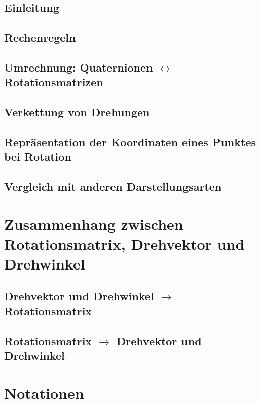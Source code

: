 \documentclass[a4paper, 11pt, accentcolor = tud3b]{tudreport}
\begin{document}
		\section{Einleitung} %

		\section{Rechenregeln} %

		\section{Umrechnung: Quaternionen \(\leftrightarrow\) Rotationsmatrizen} %

		\section{Verkettung von Drehungen} %

		\section{Repräsentation der Koordinaten eines Punktes bei Rotation} %

		\section{Vergleich mit anderen Darstellungsarten} %

	\chapter{Zusammenhang zwischen Rotationsmatrix, Drehvektor und Drehwinkel} %

		\section{Drehvektor und Drehwinkel \(\to\) Rotationsmatrix} %

		\section{Rotationsmatrix \(\to\) Drehvektor und Drehwinkel} %

	\chapter{Notationen} %
\end{document}

